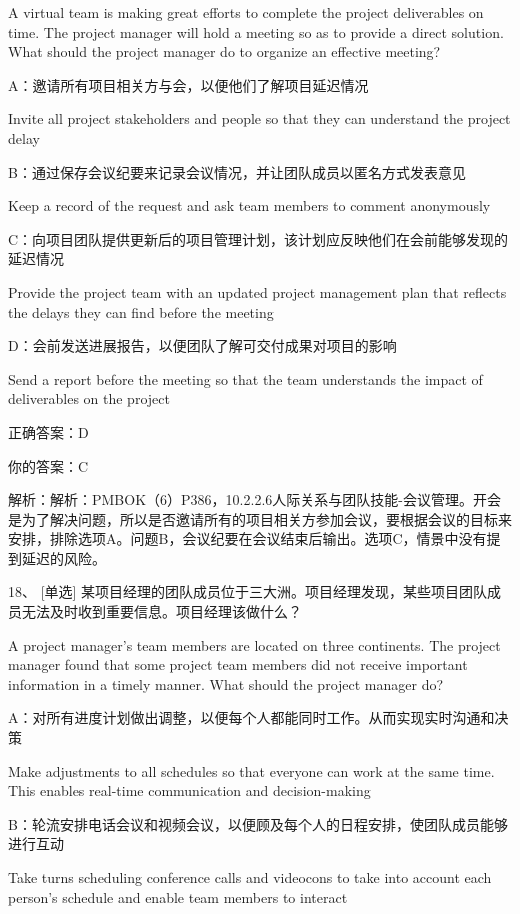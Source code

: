 A virtual team is making great efforts to complete the project deliverables on time. The project manager will hold a meeting so as to provide a direct solution. What should the project manager do to organize an effective meeting?

A：邀请所有项目相关方与会，以便他们了解项目延迟情况

Invite all project stakeholders and people so that they can understand the project delay

B：通过保存会议纪要来记录会议情况，并让团队成员以匿名方式发表意见

Keep a record of the request and ask team members to comment anonymously

C：向项目团队提供更新后的项目管理计划，该计划应反映他们在会前能够发现的延迟情况

Provide the project team with an updated project management plan that reflects the delays they can find before the meeting

D：会前发送进展报告，以便团队了解可交付成果对项目的影响

Send a report before the meeting so that the team understands the impact of deliverables on the project

正确答案：D

你的答案：C

解析：解析：PMBOK（6）P386，10.2.2.6人际关系与团队技能-会议管理。开会是为了解决问题，所以是否邀请所有的项目相关方参加会议，要根据会议的目标来安排，排除选项A。问题B，会议纪要在会议结束后输出。选项C，情景中没有提到延迟的风险。



18、 [单选] 某项目经理的团队成员位于三大洲。项目经理发现，某些项目团队成员无法及时收到重要信息。项目经理该做什么？

A project manager's team members are located on three continents. The project manager found that some project team members did not receive important information in a timely manner. What should the project manager do?

A：对所有进度计划做出调整，以便每个人都能同时工作。从而实现实时沟通和决策

Make adjustments to all schedules so that everyone can work at the same time. This enables real-time communication and decision-making

B：轮流安排电话会议和视频会议，以便顾及每个人的日程安排，使团队成员能够进行互动

Take turns scheduling conference calls and videocons to take into account each person's schedule and enable team members to interact

